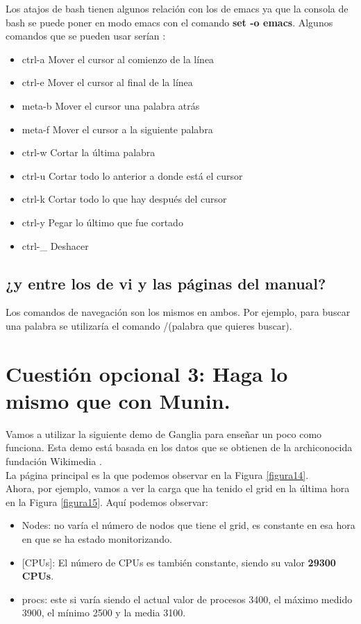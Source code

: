 Los atajos de bash \cite{bash} tienen algunos relación con los de emacs \cite{emacs} ya que la consola de bash se puede poner en modo emacs con el comando \textbf{set -o emacs}. Algunos comandos que se pueden usar serían \cite{emacsmode}: 
\begin{itemize}
	\item ctrl-a	Mover el cursor al comienzo de la línea
	\item ctrl-e	Mover el cursor al final de la línea
	\item meta-b	Mover el cursor una palabra atrás
	\item meta-f	Mover el cursor a la siguiente palabra
	\item ctrl-w	Cortar la última palabra
	\item ctrl-u	Cortar todo lo anterior a donde está el cursor
	\item ctrl-k	Cortar todo lo que hay después del cursor
	\item ctrl-y	Pegar lo último que fue cortado
	\item ctrl-\_	Deshacer
\end{itemize}

\subsection{¿y entre los de vi y las páginas del manual?}

Los comandos de navegación son los mismos en ambos. Por ejemplo, para buscar una palabra se utilizaría el comando /(palabra que quieres buscar). 


\section{Cuestión opcional 3: Haga lo mismo que con Munin.}

Vamos a utilizar la siguiente demo de Ganglia \cite{ganglia} para enseñar un poco como funciona. Esta demo está basada en los datos que se obtienen de la archiconocida fundación Wikimedia \cite{wikipedia}.\\

La página principal es la que podemos observar en la Figura \ref{figura14}.\\
Ahora, por ejemplo, vamos a ver la carga que ha tenido el grid en la última hora en la Figura \ref{figura15}. Aquí podemos observar:
\begin{itemize}
	\item \textcolor{verde}{Nodes}: no varía el número de nodos que tiene el grid, es constante en esa hora en que se ha estado monitorizando.
	\item \textcolor{rojo}[CPUs]: El número de CPUs es también constante, siendo su valor \textbf{29300 CPUs}.
	\item \textcolor{azuloscuro}{procs}: este si varía siendo el actual valor de procesos 3400, el máximo medido 3900, el mínimo 2500 y la media 3100.
\end{itemize}

